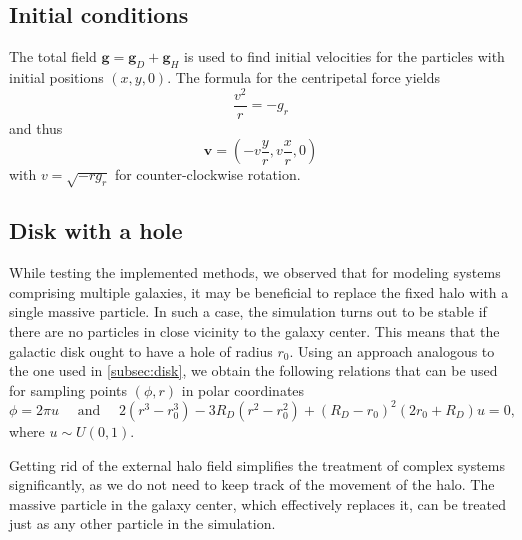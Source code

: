 \subsection{Initial conditions}
The total field $\mathbf{g} = \mathbf{g}_D + \mathbf{g}_H$ is used to find initial velocities for the particles with initial positions $(x, y, 0)$.
The formula for the centripetal force yields
\begin{equation*}
    \frac{v^2}{r} = -g_r
\end{equation*}
and thus
\begin{equation*}
    \mathbf{v} = \left(-v \frac{y}{r}, v\frac{x}{r}, 0\right)
\end{equation*}
with $v = \sqrt{- r g_r}$
for counter-clockwise rotation.

\subsection{Disk with a hole}\label{subsec:disk-with-hole}
While testing the implemented methods, we observed that for modeling systems comprising multiple galaxies, it may be beneficial to replace the fixed halo with a single massive particle.
In such a case, the simulation turns out to be stable if there are no particles in close vicinity to the galaxy center.
This means that the galactic disk ought to have a hole of radius $r_0$.
Using an approach analogous to the one used in \autoref{subsec:disk}, we obtain the following relations that can be used for sampling points $(\phi, r)$ in polar coordinates
\begin{equation*}
    \phi = 2\pi u \quad \text{ and } \quad 2(r^3 - r_0^3)-3R_D(r^2 - r_0^2) + (R_D-r_0)^2(2r_0 + R_D)u = 0,
\end{equation*}
where $u \sim U(0, 1)$.

Getting rid of the external halo field simplifies the treatment of complex systems significantly, as we do not need to keep track of the movement of the halo.
The massive particle in the galaxy center, which effectively replaces it, can be treated just as any other particle in the simulation.